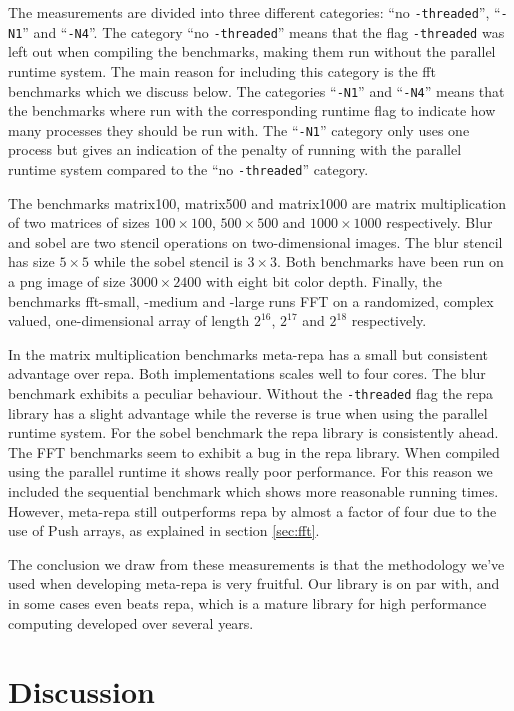 \documentclass[preprint]{sigplanconf}
\begin{document}
The measurements are divided into three different categories: ``no
\texttt{-threaded}'', ``\texttt{-N1}'' and ``\texttt{-N4}''. The
category ``no \texttt{-threaded}'' means that the flag
\texttt{-threaded} was left out when compiling the benchmarks, making
them run without the parallel runtime system. The main reason for
including this category is the fft benchmarks which we discuss below.
The categories ``\texttt{-N1}'' and ``\texttt{-N4}'' means that the
benchmarks where run with the corresponding runtime flag to indicate how
many processes they should be run with. The ``\texttt{-N1}'' category
only uses one process but gives an indication of the penalty of running
with the parallel runtime system compared to the ``no
\texttt{-threaded}'' category.

The benchmarks matrix100, matrix500 and matrix1000 are matrix
multiplication of two matrices of sizes $100 \times 100$,
$500 \times 500$ and $1000 \times 1000$ respectively. Blur and sobel are
two stencil operations on two-dimensional images. The blur stencil has
size $5 \times 5$ while the sobel stencil is $3 \times 3$. Both
benchmarks have been run on a png image of size $3000 \times 2400$ with
eight bit color depth. Finally, the benchmarks fft-small, -medium and
-large runs FFT on a randomized, complex valued, one-dimensional array
of length $2^{16}$, $2^{17}$ and $2^{18}$ respectively.

In the matrix multiplication benchmarks meta-repa has a small but
consistent advantage over repa. Both implementations scales well to four
cores. The blur benchmark exhibits a peculiar behaviour. Without the
\texttt{-threaded} flag the repa library has a slight advantage while
the reverse is true when using the parallel runtime system. For the
sobel benchmark the repa library is consistently ahead. The FFT
benchmarks seem to exhibit a bug in the repa library. When compiled
using the parallel runtime it shows really poor performance. For this
reason we included the sequential benchmark which shows more reasonable
running times. However, meta-repa still outperforms repa by almost a
factor of four due to the use of Push arrays, as explained in section
\ref{sec:fft}.

The conclusion we draw from these measurements is that the methodology
we've used when developing meta-repa is very fruitful. Our library is on
par with, and in some cases even beats repa, which is a mature library
for high performance computing developed over several years.

\section{Discussion}
\end{document}
